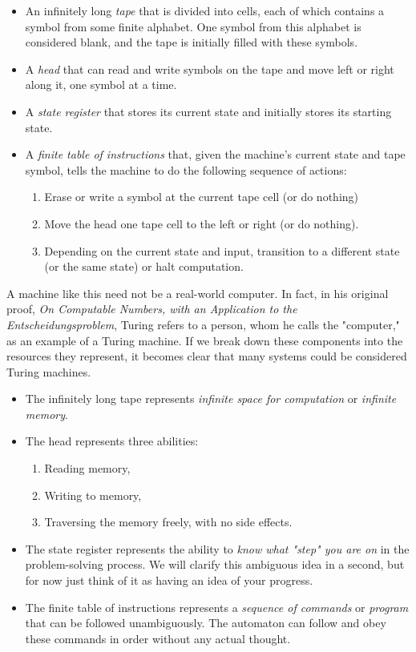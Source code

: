 \begin{itemize}
    \item An infinitely long \textit{tape} that is divided into cells, each of which contains a symbol from some finite alphabet. One symbol from this alphabet is considered blank, and the tape is initially filled with these symbols.
    \item A \textit{head} that can read and write symbols on the tape and move left or right along it, one symbol at a time.
    \item A \textit{state register} that stores its current state and initially stores its starting state.
    \item A \textit{finite table of instructions} that, given the machine's current state and tape symbol, tells the machine to do the following sequence of actions:
    \begin{enumerate}
        \item Erase or write a symbol at the current tape cell (or do nothing)
        \item Move the head one tape cell to the left or right (or do nothing).
        \item Depending on the current state and input, transition to a different state (or the same state) or halt computation.
    \end{enumerate}
\end{itemize}

A machine like this need not be a real-world computer. In fact, in his original proof, \textit{On Computable Numbers, with an Application to the Entscheidungsproblem}, Turing refers to a person, whom he calls the "computer," as an example of a Turing machine. If we break down these components into the resources they represent, it becomes clear that many systems could be considered Turing machines.

\begin{itemize}
    \item The infinitely long tape represents \textit{infinite space for computation} or \textit{infinite memory}.
    \item The head represents three abilities:
        \begin{enumerate}
            \item Reading memory,
            \item Writing to memory,
            \item Traversing the memory freely, with no side effects.
        \end{enumerate}
    \item The state register represents the ability to \textit{know what "step" you are on} in the problem-solving process. We will clarify this ambiguous idea in a second, but for now just think of it as having an idea of your progress.
    \item The finite table of instructions represents a \textit{sequence of commands} or \textit{program} that can be followed unambiguously. The automaton can follow and obey these commands in order without any actual thought.
\end{itemize}

